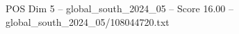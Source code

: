 \begin{textsample}{POS Dim 5 – global\_south\_2024\_05 – Score 16.00 – global\_south\_2024\_05/108044720.txt}
\end{textsample}
